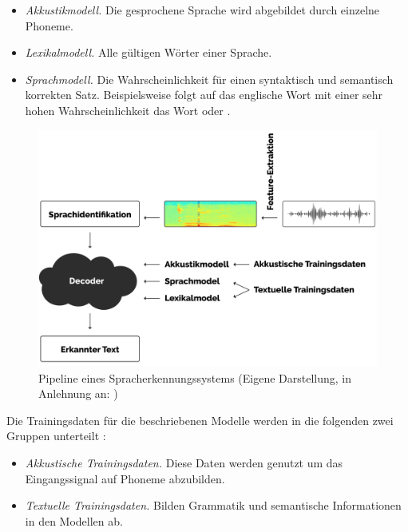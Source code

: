 \begin{itemize}
    \item \textit{Akkustikmodell.} Die gesprochene Sprache wird abgebildet durch einzelne Phoneme.
    \item \textit{Lexikalmodell.} Alle gültigen Wörter einer Sprache.
    \item \textit{Sprachmodell.} Die Wahrscheinlichkeit für einen syntaktisch und semantisch korrekten Satz.
            Beispielsweise folgt auf das englische Wort \grqq{} mit einer sehr hohen Wahrscheinlichkeit das Wort \grqq{} oder
        \grqq{}.
\end{itemize}

\begin{figure}[h!]
    \centering
    \includegraphics[width=1\linewidth]{images/pipeline}
    \caption{Pipeline eines Spracherkennungssystems (Eigene Darstellung, in Anlehnung an: \cite{Tom.2016}) }%
    \label{fig:pipeline}
\end{figure}

Die Trainingsdaten für die beschriebenen Modelle werden in die folgenden zwei Gruppen unterteilt \cite{Tom.2016}:

\begin{itemize}
    \item \textit{Akkustische Trainingsdaten.} Diese Daten werden genutzt um das Eingangssignal auf Phoneme abzubilden.
    \item \textit{Textuelle Trainingsdaten.} Bilden Grammatik und semantische Informationen in den Modellen ab.
\end{itemize}